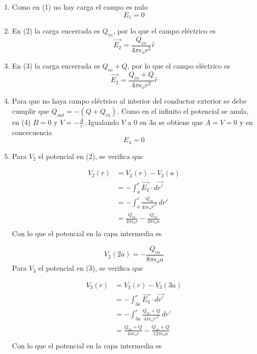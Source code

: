 \begin{enumerate}[label=\alph*)]
    \item Como en (1) no hay carga el campo es nulo
    \[E_1 = 0\]
    \item En (2) la carga encerrada es $Q_{in}$, por lo que el campo eléctrico es
    \[\Vec{E_2} = \frac{Q_{in}}{4\pi\epsilon_o r^2}\hat{r}\]
    \item En (3) la carga encerrada es $Q_{in}+Q$, por lo que el campo eléctrico es
    \[\Vec{E_2} = \frac{Q_{in}+Q}{4\pi\epsilon_o r^2}\hat{r}\]
    \item Para que no haya campo eléctrico al interior del conductor exterior se debe cumplir que $Q_{out} = -(Q+Q_{in})$. Como en el infinito el potencial se anula, en (4) $B=0$ y $V = -\frac{A}{r}$. Igualando $V$ a 0 en $3a$ se obtiene que $A=V=0$ y en concecuencia
    \[E_4 = 0\]


    \item Para $V_2$ el potencial en (2), se verifica que

    \begin{equation}
    \begin{split}
        V_2(r) & = V_2(r) - V_2(a)\\
        & = -\int^r_a\Vec{E_2}\cdot d\Vec{r'}\\
       & = -\int^r_a\frac{Q_{in}}{4\pi\epsilon_o {r'}^2}\,dr'\\
       & = \frac{Q_{in}}{4\pi\epsilon_o r} - \frac{Q_{in}}{4\pi\epsilon_o a}\\
    \end{split}
    \nonumber
    \end{equation}
    Con lo que el potencial en la capa intermedia es

    \[V_2(2a) = -\frac{Q_{in}}{8\pi\epsilon_o a}\]
    \medbreak
    Para $V_3$ el potencial en (3), se verifica que

    \begin{equation}
    \begin{split}
      V_3(r) & = V_3(r) - V_3(3a)\\
      & = -\int^r_{3a}\Vec{E_3}\cdot d\Vec{r'}\\
      & = -\int^r_{3a}\frac{Q_{in}+Q}{4\pi\epsilon_o {r'}^2}\,dr'\\
      & = \frac{Q_{in}+Q}{4\pi\epsilon_o r} - \frac{Q_{in}+Q}{12\pi\epsilon_o a}\\
    \end{split}
    \nonumber
    \end{equation}
    Con lo que el potencial en la capa intermedia es


\end{enumerate}
